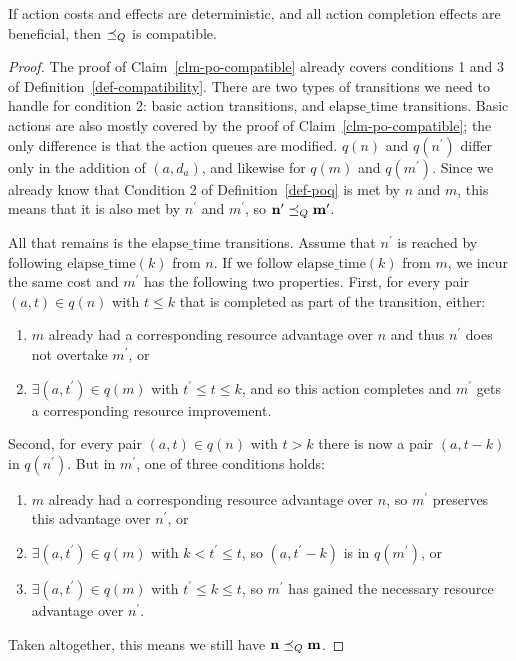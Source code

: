 \documentclass[letterpaper]{article}
\theoremstyle{plain} \newtheorem{theorem}{Theorem} \newtheorem{proposition}{Proposition} \newtheorem{lemma}{Lemma}
\theoremstyle{definition} \newtheorem{definition}{Definition} \newtheorem{conjecture}{Conjecture} \newtheorem*{example}{Example}
\theoremstyle{remark} \newtheorem*{remark}{Remark} \newtheorem*{note}{Note} \newtheorem{case}{Case}
\begin{document}
\begin{claim}{}{\label{clm-poq-compatible}}
	If action costs and effects are deterministic, and all action completion effects are beneficial, then $\preceq_Q$ is compatible.
\end{claim}
\begin{proof}

	The proof of Claim~\ref{clm-po-compatible} already covers conditions 1 and 3 of
Definition~\ref{def-compatibility}. There are two types of transitions we need to handle
for condition 2: basic action transitions, and $\mathrm{elapse\_time}$ transitions. Basic
actions are also mostly covered by the proof of Claim~\ref{clm-po-compatible}; the only
difference is that the action queues are modified. $q(n)$ and
$q(n^\prime)$ differ only in the addition of $(a, d_a)$, and likewise for $q(m)$ and $q(m^\prime)$. Since we
already know that Condition 2 of Definition~\ref{def-poq} is met by $n$ and $m$, this
means that it is also met by $n^\prime$ and $m^\prime$, so $\textbf{n}^\prime \preceq_Q \textbf{m}^\prime$.

	All that remains is the $\mathrm{elapse\_time}$ transitions. Assume that $n^\prime$ is
reached by following $\mathrm{elapse\_time}(k)$ from $n$. If we follow $\mathrm{elapse\_time}(k)$ from $m$, we incur the same cost and $m^\prime$ has the following two properties. First, for every pair $(a, t) \in q(n)$ with $t \le k$ that is completed as part of the transition, either:
\begin{enumerate}
	\item $m$ already had a corresponding resource advantage over $n$ and thus $n^\prime$ does not overtake $m^\prime$, or
	\item $\exists (a, t^\prime) \in q(m)$ with $t^\prime \le t \le k$, and so this action completes and $m^\prime$ gets a corresponding resource improvement.
\end{enumerate}
Second, for every pair $(a, t) \in q(n)$ with $t > k$ there is now a pair $(a, t-k)$ in $q(n^\prime)$. But in $m^\prime$, one of three conditions holds:
\begin{enumerate}
	\item $m$ already had a corresponding resource advantage over $n$, so $m^\prime$ preserves this advantage over $n^\prime$, or
	\item $\exists (a, t^\prime) \in q(m)$ with $k < t^\prime \le t$, so $(a, t^\prime-k)$ is in $q(m^\prime)$, or
	\item $\exists (a, t^\prime) \in q(m)$ with $t^\prime \le k \le t$, so $m^\prime$ has gained the necessary resource advantage over $n^\prime$.
\end{enumerate}
Taken altogether, this means we still have $\textbf{n} \preceq_Q \textbf{m}$.

\end{proof}
\end{document}
